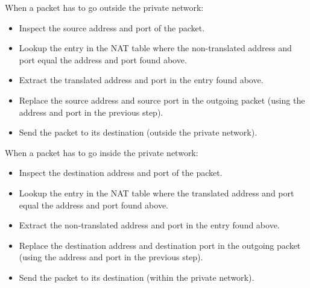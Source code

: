 When a packet has to go outside the private network:
\begin{itemize}
\item Inspect the source address and port of the packet.
\item Lookup the entry in the NAT table where the non-translated address and port equal the address and port found above.
\item Extract the translated address and port in the entry found above.
\item Replace the source address and source port in the outgoing packet (using the address and port in the previous step).
\item Send the packet to its destination (outside the private network).
\end{itemize}

When a packet has to go inside the private network:
\begin{itemize}
\item Inspect the destination address and port of the packet.
\item Lookup the entry in the NAT table where the translated address and port equal the address and port found above.
\item Extract the non-translated address and port in the entry found above.
\item Replace the destination address and destination port in the outgoing packet (using the address and port in the previous step).
\item Send the packet to its destination (within the private network).
\end{itemize}